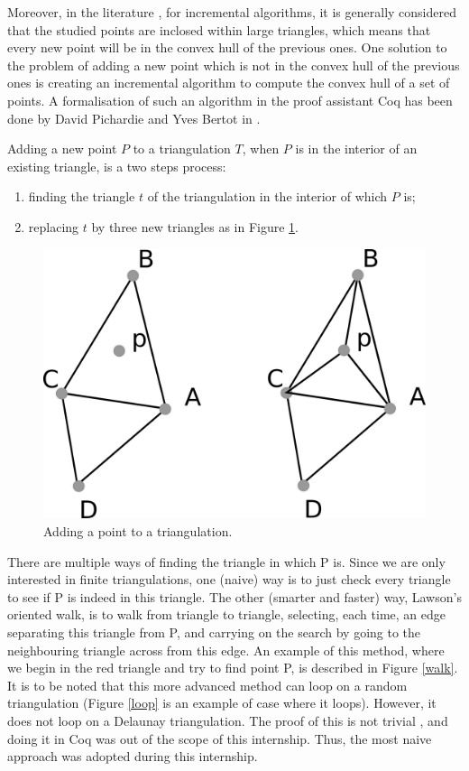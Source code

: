 \documentclass[a4paper,10pt]{article}
\begin{document}
Moreover, in the literature \cite{Del}, for incremental algorithms, it is generally considered that the studied points are inclosed within large triangles, which means that every new point will be in the convex hull of the previous ones. One solution to the problem of adding a new point which is not in the convex hull of the previous ones is creating an incremental algorithm to compute the convex hull of a set of points. A formalisation of such an algorithm in the proof assistant {\sc Coq} has been done by David Pichardie and Yves Bertot in \cite{Hull}.

Adding a new point $P$ to a triangulation $T$, when $P$ is in the interior of an existing triangle, is a two steps process:
\begin{enumerate}
\item finding the triangle $t$ of the triangulation in the interior of which $P$ is;
\item replacing $t$ by three new triangles as in Figure \ref{adding}.
\end{enumerate}
\begin{figure}
\centering
\includegraphics[scale=1]{adding}
\caption{\label{adding} Adding a point to a triangulation.}
\end{figure}

There are multiple ways of finding the triangle in which P is. Since we are only interested in finite triangulations, one (naive) way is to just check every triangle to see if P is indeed in this triangle. The other (smarter and faster) way, Lawson's oriented walk, is to walk from triangle to triangle, selecting, each time, an edge separating this triangle from P, and carrying on the search by going to the neighbouring triangle across from this edge. An example of this method, where we begin in the red triangle and try to find point P, is described in Figure \ref{walk}. It is to be noted that this more advanced method can loop on a random triangulation (Figure \ref{loop} is an example of case where it loops). However, it does not loop on a Delaunay triangulation. The proof of this is not trivial \cite{lawson}, and doing it in {\sc Coq} was out of the scope of this internship.
Thus, the most naive approach was adopted during this internship.
\end{document}
